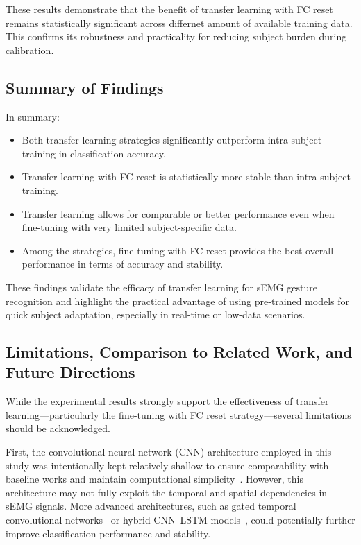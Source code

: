 \begin{multicols}{2}
These results demonstrate that the benefit of transfer learning with FC reset remains statistically significant across differnet amount of available training data. This confirms its robustness and practicality for reducing subject burden during calibration.

\subsection*{Summary of Findings}

In summary:
\begin{itemize}
    \item Both transfer learning strategies significantly outperform intra-subject training in classification accuracy.
    \item Transfer learning with FC reset is statistically more stable than intra-subject training.
    \item Transfer learning allows for comparable or better performance even when fine-tuning with very limited subject-specific data.
    \item Among the strategies, fine-tuning with FC reset provides the best overall performance in terms of accuracy and stability.
\end{itemize}

These findings validate the efficacy of transfer learning for sEMG gesture recognition and highlight the practical advantage of using pre-trained models for quick subject adaptation, especially in real-time or low-data scenarios.

\subsection*{Limitations, Comparison to Related Work, and Future Directions}

While the experimental results strongly support the effectiveness of transfer learning—particularly the fine-tuning with FC reset strategy—several limitations should be acknowledged.

First, the convolutional neural network (CNN) architecture employed in this study was intentionally kept relatively shallow to ensure comparability with baseline works and maintain computational simplicity~\cite{Cote2019_3DC,LibEMG2023}. However, this architecture may not fully exploit the temporal and spatial dependencies in sEMG signals. More advanced architectures, such as gated temporal convolutional networks~\cite{Xie2024} or hybrid CNN–LSTM models~\cite{Faust2018}, could potentially further improve classification performance and stability.


\end{multicols}
